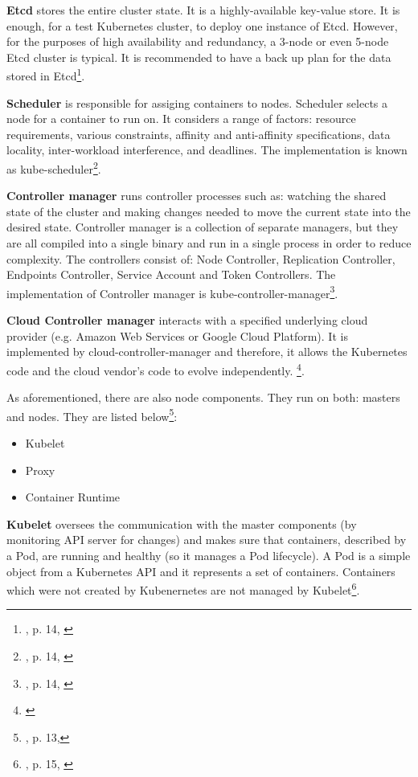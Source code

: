 \textbf{Etcd} stores the entire cluster state. It is a highly-available key-value store. It is enough, for a test Kubernetes cluster, to deploy one instance of Etcd. However, for the purposes of high availability and redundancy, a 3-node or even 5-node Etcd cluster is typical. It is recommended to have a back up plan for the data stored in Etcd\footnote{\cite{book-mastering-k8s}, p. 14, \cite{k8s-components}}.

\textbf{Scheduler} is responsible for assiging containers to nodes. Scheduler selects a node for a container to run on. It considers a range of factors: resource requirements, various constraints, affinity and anti-affinity specifications, data locality, inter-workload interference, and deadlines. The implementation is known as kube-scheduler\footnote{\cite{book-mastering-k8s}, p. 14, \cite{k8s-components}}.

\textbf{Controller manager} runs controller processes such as: watching the shared state of the cluster and making changes needed to move the current state into the desired state. Controller manager is a collection of separate managers, but they are all compiled into a single binary and run in a single process in order to reduce complexity. The controllers consist of: Node Controller, Replication Controller, Endpoints Controller, Service Account and Token Controllers. The implementation of Controller manager is kube-controller-manager\footnote{\cite{book-mastering-k8s}, p. 14, \cite{k8s-components}}.

\textbf{Cloud Controller manager} interacts with a specified underlying cloud provider (e.g. Amazon Web Services or Google Cloud Platform). It is implemented by cloud-controller-manager and therefore, it allows the Kubernetes code and the cloud vendor’s code to evolve independently. \footnote{\cite{k8s-components}}.

As aforementioned, there are also node components. They run on both: masters and nodes. They are listed below\footnote{\cite{book-mastering-k8s}, p. 13,\cite{k8s-components}}:
\begin{itemize}
\item Kubelet
\item Proxy
\item Container Runtime
\end{itemize}

\textbf{Kubelet} oversees the communication with the master components (by monitoring API server for changes) and makes sure that containers, described by a Pod, are running and healthy (so it manages a Pod lifecycle). A Pod is a simple object from a Kubernetes API and it represents a set of containers. Containers which were not created by Kubenernetes are not managed by Kubelet\footnote{\cite{book-mastering-k8s}, p. 15, \cite{k8s-components}}.

